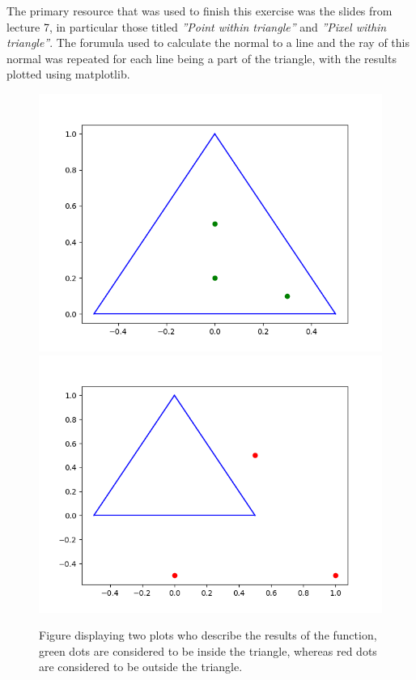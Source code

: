 \documentclass[a4paper, titlepage,12pt]{article}
\begin{document}
	The primary resource that was used to finish this exercise was the slides from lecture 7, in particular those titled \textit{''Point within triangle''} and \textit{''Pixel within triangle''}. The forumula used to calculate the normal to a line and the ray of this normal was repeated for each line being a part of the triangle, with the results plotted using matplotlib.

	\begin{figure}
		\begin{center}
			\includegraphics[scale=0.4]{./inside_triangle.png}
			\includegraphics[scale=0.4]{./outside_triangle.png}
			\caption{Figure displaying two plots who describe the results of the function, green dots are considered to be inside the triangle, whereas red dots are considered to be outside the triangle.}
		\end{center}
	\end{figure}
\end{document}
